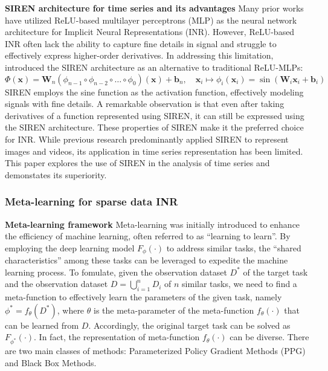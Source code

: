 \documentclass{article}
\begin{document}
\textbf{SIREN architecture for time series and its advantages}
Many prior works have utilized ReLU-based multilayer perceptrons (MLP) as the neural network architecture for Implicit Neural Representations (INR). 
However, ReLU-based INR often lack the ability to capture fine details in signal and struggle to effectively express higher-order derivatives.
In addressing this limitation, \cite{sitzmann2020implicit} introduced the SIREN architecture as an alternative to traditional ReLU-MLPs:
$$
\Phi(\mathbf{x})=\mathbf{W}_n\left(\phi_{n-1} \circ \phi_{n-2} \circ \ldots \circ \phi_0\right)(\mathbf{x})+\mathbf{b}_n, \quad \mathbf{x}_i \mapsto \phi_i\left(\mathbf{x}_i\right)=\sin \left(\mathbf{W}_i \mathbf{x}_i+\mathbf{b}_i\right)
$$
SIREN employs the sine function as the activation function, effectively modeling signals with fine details.
A remarkable observation is that even after taking derivatives of a function represented using SIREN, 
it can still be expressed using the SIREN architecture. 
These properties of SIREN make it the preferred choice for INR.
While previous research predominantly applied SIREN to represent images and videos, its application in time series representation has been limited. 
This paper explores the use of SIREN in the analysis of time series and demonstates its superiority.


\subsubsection{Meta-learning for sparse data INR}

\textbf{Meta-learning framework}
Meta-learning was initially introduced to enhance the efficiency of machine learning, often referred to as ``learning to learn''.
By employing the deep learning model $F_\phi(\cdot)$ to address similar tasks, the ``shared characteristics'' among these tasks can be leveraged to expedite the machine learning process. \cite{raghu2019rapid}
To fomulate, given the observation dataset $D^*$ of the target task and the observation dataset $D=\bigcup_{i=1}^n D_i$ of $n$ similar tasks, we need to find a meta-function to effectively learn the parameters of the given task, namely $\phi^*=f_\theta(D^*)$,
where $\theta$ is the meta-parameter of the meta-function $f_\theta(\cdot)$ that can be learned from $D$. Accordingly, the original target task can be solved as $F_{\phi^*}(\cdot)$.
In fact, the representation of meta-function $f_\theta(\cdot)$ can be diverse. There are two main classes of methods:  Parameterized Policy Gradient Methods (PPG) and Black Box Methods.
\end{document}
